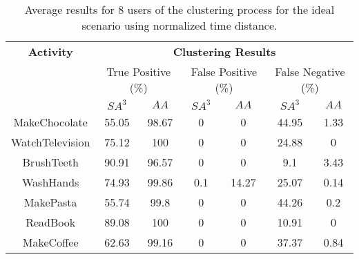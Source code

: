 \begin{table}[htbp]\scriptsize
  \begin{center}
        \begin{tabular}{ccccccc}
            \hline            
            \textbf{Activity} & \multicolumn{6}{c}{\textbf{Clustering Results}} \\
             & \multicolumn{2}{c}{True Positive (\%)} & \multicolumn{2}{c}{False Positive (\%)} & \multicolumn{2}{c}{False Negative (\%)} \\
             & $SA^3$ & $AA$ & $SA^3$ & $AA$ & $SA^3$ & $AA$ \\
            \hline
            MakeChocolate   & 55.05 & 98.67 & 0    & 0    & 44.95 & 1.33 \\
	    WatchTelevision & 75.12 & 100   & 0    & 0    & 24.88 & 0    \\
	    BrushTeeth      & 90.91 & 96.57 & 0    & 0    & 9.1   & 3.43 \\
	    WashHands       & 74.93 & 99.86 & 0.1  & 14.27 & 25.07 & 0.14 \\
	    MakePasta       & 55.74 & 99.8  & 0    & 0    & 44.26 & 0.2 \\
	    ReadBook        & 89.08 & 100   & 0    & 0    & 10.91 & 0 \\
	    MakeCoffee      & 62.63 & 99.16 & 0    & 0    & 37.37 & 0.84 \\
            \hline
        \end{tabular}
        \caption{Average results for 8 users of the clustering process for the ideal scenario using normalized time distance.}
        \label{tab-r-ideal-t1}
        \end{center}
\end{table}

